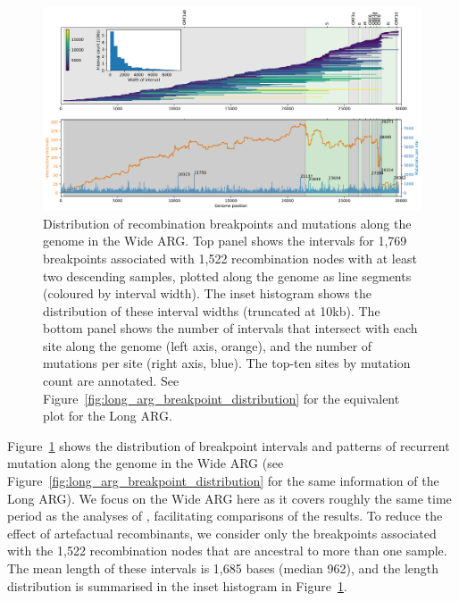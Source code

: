 \documentclass{article}
\begin{document}
\begin{figure}
\centering
\includegraphics[width=\textwidth]{figures/wide_arg_recombination_intervals.pdf}
\caption{\label{fig:breakpoint-distribution}
Distribution of recombination breakpoints and mutations along the genome in
the Wide ARG. Top panel shows the intervals for 1,769 breakpoints associated
with 1,522 recombination nodes with at least two descending samples, plotted along the genome
as line segments (coloured by interval width). The inset histogram shows the
distribution of these interval widths (truncated at 10kb).
The bottom panel shows the number of intervals that intersect with
each site along the genome (left axis, orange), and the number of mutations
per site (right axis, blue).
The top-ten sites by mutation count are annotated.
See Figure~\ref{fig:long_arg_breakpoint_distribution} for the equivalent plot
for the Long ARG.}
\end{figure}

Figure~\ref{fig:breakpoint-distribution} shows the distribution of breakpoint
intervals and patterns of recurrent mutation along the genome in the Wide ARG
(see Figure~\ref{fig:long_arg_breakpoint_distribution} for the same information
of the Long ARG). We focus on the Wide ARG here as it covers roughly the same time
period as the analyses of \cite{Turakhia2022-it}, facilitating comparisons
of the results. To reduce the effect of artefactual recombinants, we
consider only the breakpoints associated with the 1,522 recombination nodes
that are ancestral to more than one sample. The mean length of these intervals
is 1,685 bases (median 962), and the length distribution is summarised in the
inset histogram in Figure~\ref{fig:breakpoint-distribution}.
\end{document}
